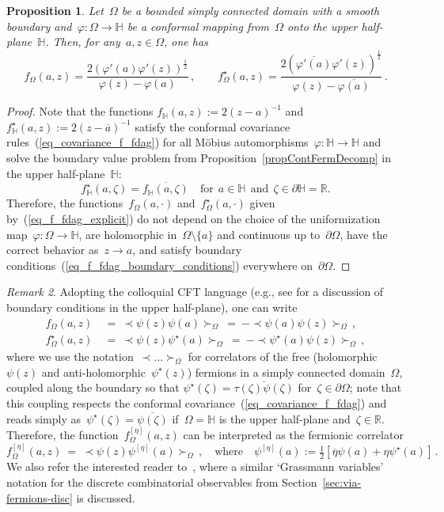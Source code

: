 \documentclass[reqno,11pt,a4paper]{amsart}
\newtheorem{proposition}{Proposition}[section]
\theoremstyle{remark}
\newtheorem{remark}[proposition]{Remark}
\newcommand{\R}{\mathbb{R}}
\renewcommand{\H}{\mathbb{H}}
\newcommand{\feta}{f_{\Omega}^{[\eta]}}
\newcommand{\f}{f_{\Omega}}
\newcommand{\fstar}{f_{\Omega}^\star}
\newcommand{\fstarH}{f^\star_{\H}}
\newcommand\opsi{\psi^\star}
\newcommand\CorrFerm[2]{\prec\! #2 \!\succ_{#1}{}}
\begin{document}
\begin{proposition} \label{prop:fH_explicit}
Let~$\Omega$ be a bounded simply connected domain with a smooth boundary and~$\varphi:\Omega\to\H$ be a conformal mapping from~$\Omega$ onto the upper half-plane~$\H$. Then, for any~$a,z\in\Omega$, one has
\begin{equation}
\label{eq_f_fdag_explicit}
\f(a,z)=\frac{2(\varphi'(a)\varphi'(z))^{\frac12}}{\varphi(z)-\varphi(a)}\,,\qquad \fstar(a,z)= \frac{2(\overline{\varphi'(a)}\varphi'(z))^{\frac12}}{\varphi(z)-\overline{\varphi(a)}}\,.
\end{equation}
\end{proposition}
\begin{proof} Note that the functions $f_\H(a,z):=2(z-a)^{-1}$ and $\fstarH(a,z):=2(z-\overline{a})^{-1}$
satisfy the conformal covariance rules~(\ref{eq_covariance_f_fdag}) for all M\"obius automorphisms~$\varphi:\H\to\H$ and solve the boundary value problem from Proposition~\ref{propContFermDecomp} in the upper half-plane~$\H$:
\[
\fstarH(a,\zeta)=\overline{f_\H(a,\zeta)}\quad \text{for}\ \ a\in\H\ \ \text{and}\ \ \zeta\in\partial\H=\R.
\]
Therefore, the functions~$\f(a,\cdot)$ and~$\fstar(a,\cdot)$ given by~(\ref{eq_f_fdag_explicit}) do not depend on the choice of the uniformization map~$\varphi:\Omega\to\H$, are holomorphic in~$\Omega\setminus\{a\}$ and continuous up to~$\partial\Omega$, have the correct behavior as~$z\to a$, and satisfy boundary conditions~(\ref{eq_f_fdag_boundary_conditions}) everywhere on~$\partial\Omega$.
\end{proof}

\begin{remark}\label{rem:CFT-terminology}
Adopting the colloquial CFT language (e.g., see \cite[Sec. 4, pp.20-21]{GhoZam94} for a discussion of boundary conditions in the upper half-plane), one can write
\begin{align*}
\f(a,z)~&=~\CorrFerm\Omega{\psi(z)\psi(a)}~=~-\CorrFerm\Omega{\psi(a)\psi(z)}\,,\\
\fstar(a,z)~&=~\CorrFerm\Omega{\psi(z)\opsi(a)}~=~-\CorrFerm\Omega{\opsi(a)\psi(z)}\,,
\end{align*}
where we use the notation~$\CorrFerm\Omega{\dots}$ for correlators of the free (holomorphic~$\psi(z)$ and anti-holomorphic~$\opsi(z)$) fermions in a simply connected domain~$\Omega$, coupled along the boundary so that $\opsi(\zeta)=\overline{\tau(\zeta)\psi(\zeta)}$ for~$\zeta\in\partial\Omega$; note that this coupling respects the conformal covariance~(\ref{eq_covariance_f_fdag}) and reads simply as~$\opsi(\zeta)=\overline{\psi(\zeta)}$ if~$\Omega=\H$ is the upper half-plane and~$\zeta\in\R$. Therefore, the function~$\feta(a,z)$ can be interpreted as the fermionic correlator
\[
\feta(a,z)~=~\CorrFerm\Omega{\psi(z)\psi^{[\eta]}(a)}\,,\quad\text{where}\quad \psi^{[\eta]}(a):=\tfrac{1}{2}[\overline{\eta}\psi(a)+\eta\opsi(a)]\,.
\]
We also refer the interested reader to~\cite[Section~3.6]{CheCimKas15}, where a similar `Grassmann variables' notation for the discrete combinatorial observables from Section~\ref{sec:via-fermions-disc} is discussed.
\end{remark}
\end{document}
